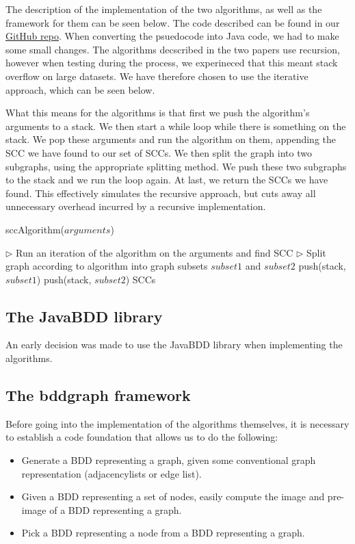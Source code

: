 \documentclass[../master/master.tex]{subfiles}
\begin{document}
The description of the implementation of the two algorithms, as well as the framework for them can be seen below. The code described can be found in our \href{https://github.com/mikaelbdj/bachelor-thesis}{GitHub repo}. When converting the psuedocode into Java code, we had to make some small changes. The algorithms decscribed in the two papers \cite{lockstep}\cite{linear} use recursion, however when testing during the process, we experineced that this meant stack overflow on large datasets. We have therefore chosen to use the iterative approach, which can be seen below.

What this means for the algorithms is that first we push the algorithm's arguments to a stack. We then start a while loop while there is something on the stack. We pop these arguments and run the algorithm on them, appending the SCC we have found to our set of SCCs. We then split the graph into two subgraphs, using the appropriate splitting method. We push these two subgraphs to the stack and we run the loop again. At last, we return the SCCs we have found. This effectively simulates the recursive approach, but cuts away all unnecessary overhead incurred by a recursive implementation.

\begin{algorithm}[H]
  \caption{sccAlgorithm($arguments$)}
  \begin{algorithmic}[1]
    \Statex
    \State \(\triangleright\) Run an iteration of the algorithm on the arguments and find SCC
    \State \(\triangleright\) Split graph according to algorithm into graph subsets $subset1$ and $subset2$
    \State push(stack, $subset1$)
    \State push(stack, $subset2$)
    \EndWhile
    \Statex
    \State \Return SCCs
  \end{algorithmic}
\end{algorithm}

\subsection{The JavaBDD library}
An early decision was made to use the JavaBDD library when implementing the algorithms. \cite{whaley}

\subsection{The bddgraph framework}
Before going into the implementation of the algorithms themselves, it is necessary to establish a code foundation that allows us to do the following:
\begin{itemize}
\item Generate a BDD representing a graph, given some conventional graph representation (adjacencylists or edge list).
\item Given a BDD representing a set of nodes, easily compute the image and pre-image of a BDD representing a graph.
\item Pick a BDD representing a node from a BDD representing a graph.
\end{itemize}
\end{document}
